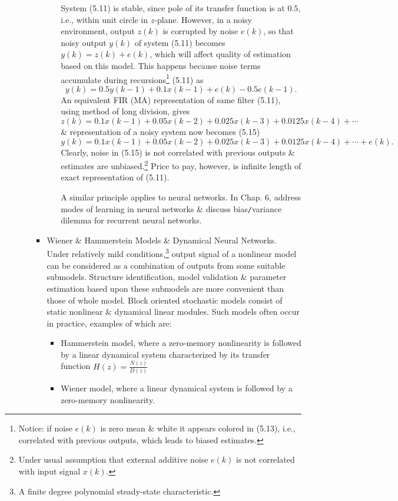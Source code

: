 \documentclass{article}
\begin{document}
\begin{enumerate}
\begin{itemize}
\begin{itemize}
\begin{itemize}
				System (5.11) is stable, since pole of its transfer function is at $0.5$, i.e., within unit circle in $z$-plane. However, in a noisy environment, output $z(k)$ is corrupted by noise $e(k)$, so that noisy output $y(k)$ of system (5.11) becomes $y(k) = z(k) + e(k)$, which will affect quality of estimation based on this model. This happens because noise terms accumulate during recursions\footnote{Notice: if noise $e(k)$ is zero mean \& white it appears colored in (5.13), i.e., correlated with previous outputs, which leads to biased estimates.} (5.11) as
				\begin{equation}
					y(k) = 0.5y(k - 1) + 0.1x(k - 1) + e(k) - 0.5e(k - 1).
				\end{equation}
				An equivalent FIR (MA) representation of same filter (5.11), using method of long division, gives
				\begin{equation}
					z(k) = 0.1x(k - 1) + 0.05x(k - 2) + 0.025x(k - 3) + 0.0125x(k - 4) + \cdots
				\end{equation}
				\& representation of a noisy system now becomes (5.15)
				\begin{equation}
					y(k) = 0.1x(k - 1) + 0.05x(k - 2) + 0.025x(k - 3) + 0.0125x(k - 4) + \cdots + e(k).
				\end{equation}
				Clearly, noise in (5.15) is not correlated with previous outputs \& estimates are unbiased.\footnote{Under usual assumption that external additive noise $e(k)$ is not correlated with input signal $x(k)$.} Price to pay, however, is infinite length of exact representation of (5.11).
				
				A similar principle applies to neural networks. In Chap. 6, address modes of learning in neural networks \& discuss bias{\tt/}variance dilemma for recurrent neural networks.
			\end{itemize}
			\item {\sf Wiener \& Hammerstein Models \& Dynamical Neural Networks.} Under relatively mild conditions,\footnote{A finite degree polynomial steady-state characteristic.} output signal of a nonlinear model can be considered as a combination of outputs from some suitable submodels. Structure identification, model validation \& parameter estimation based upon these submodels are more convenient than those of whole model. Block oriented stochastic models consist of static nonlinear \& dynamical linear modules. Such models often occur in practice, examples of which are:
			\begin{itemize}
				\item Hammerstein model, where a zero-memory nonlinearity is followed by a linear dynamical system characterized by its transfer function $H(z) = \frac{N(z)}{D(z)}$
				\item Wiener model, where a linear dynamical system is followed by a zero-memory nonlinearity.
			\end{itemize}
			

\end{itemize}
\end{itemize}
\end{enumerate}
\end{document}
